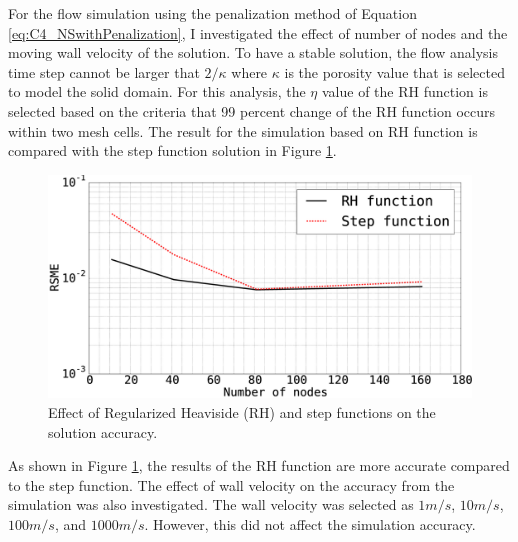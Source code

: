 For the flow simulation using the penalization method of Equation \eqref{eq:C4_NSwithPenalization}, I investigated the effect of number of nodes and the moving wall velocity of the solution. To have a stable solution, the flow analysis time step cannot be larger that $2 / \kappa$ where $\kappa$ is the porosity value that is selected to model the solid domain. For this analysis, the $\eta$ value of the RH function is selected based on the criteria that 99 percent change of the RH function occurs within two mesh cells. The result for the simulation based on RH function is compared with the step function solution in Figure \ref{fig:C4_effectOfRHfunctionOnSimulationResults1Dproblem}.
%
\begin{figure}[H]
    \centering
    \includegraphics[width=12.00cm]{Chapter_4/figure/effect_of_RH_on_simulation_vs_numberOfNodes_1D_problem.eps}
    \caption{Effect of Regularized Heaviside (RH) and step functions on the solution accuracy.}
    \label{fig:C4_effectOfRHfunctionOnSimulationResults1Dproblem}
\end{figure}
%
As shown in Figure \ref{fig:C4_effectOfRHfunctionOnSimulationResults1Dproblem}, the results of the RH function are more accurate compared to the step function. The effect of wall velocity on the accuracy from the simulation was also investigated. The wall velocity was selected as $1 m/s$, $10 m/s$, $100 m/s$, and $1000 m/s$. However, this did not affect the simulation accuracy.

